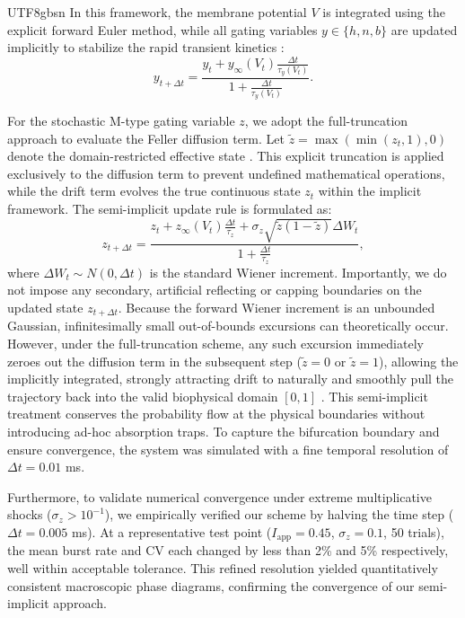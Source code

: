 ﻿\documentclass[reprint, amsmath, amssymb, aps, pre]{revtex4-2}
\begin{document}
\begin{CJK*}{UTF8}{gbsn}
In this framework, the membrane potential $V$ is integrated using the explicit forward Euler method, while all gating variables $y \in \{h, n, b\}$ are updated implicitly to stabilize the rapid transient kinetics \cite{rush1978practical, ermentrout2010mathematical}:
\begin{equation}
y_{t+\Delta t} = \frac{y_t + y_\infty(V_t) \frac{\Delta t}{\tau_y(V_t)}}{1 + \frac{\Delta t}{\tau_y(V_t)}}.
\end{equation}

For the stochastic M-type gating variable $z$, we adopt the full-truncation approach \cite{lord2010comparison, hutzenthaler2020perturbation} to evaluate the Feller diffusion term. Let $\tilde{z} = \max(\min(z_t, 1), 0)$ denote the domain-restricted effective state \cite{lord2010comparison}. This explicit truncation is applied exclusively to the diffusion term to prevent undefined mathematical operations, while the drift term evolves the true continuous state $z_t$ within the implicit framework. The semi-implicit update rule is formulated as:
\begin{equation}
z_{t+\Delta t} = \frac{z_t + z_\infty(V_t) \frac{\Delta t}{\tau_z} + \sigma_z \sqrt{\tilde{z}(1 - \tilde{z})} \Delta W_t}{1 + \frac{\Delta t}{\tau_z}},
\end{equation}
where $\Delta W_t \sim N(0, \Delta t)$ is the standard Wiener increment. Importantly, we do not impose any secondary, artificial reflecting or capping boundaries on the updated state $z_{t+\Delta t}$. Because the forward Wiener increment is an unbounded Gaussian, infinitesimally small out-of-bounds excursions can theoretically occur. However, under the full-truncation scheme, any such excursion immediately zeroes out the diffusion term in the subsequent step ($\tilde{z}=0$ or $\tilde{z}=1$), allowing the implicitly integrated, strongly attracting drift to naturally and smoothly pull the trajectory back into the valid biophysical domain $[0,1]$ \cite{lord2010comparison}. This semi-implicit treatment conserves the probability flow at the physical boundaries without introducing ad-hoc absorption traps. To capture the bifurcation boundary and ensure convergence, the system was simulated with a fine temporal resolution of $\Delta t = 0.01$ ms.

Furthermore, to validate numerical convergence under extreme multiplicative shocks ($\sigma_z > 10^{-1}$), we empirically verified our scheme by halving the time step ($\Delta t = 0.005$ ms). At a representative test point ($I_{\mathrm{app}} = 0.45$, $\sigma_z = 0.1$, 50 trials), the mean burst rate and CV each changed by less than 2\% and 5\% respectively, well within acceptable tolerance. This refined resolution yielded quantitatively consistent macroscopic phase diagrams, confirming the convergence of our semi-implicit approach.


\end{CJK*}
\end{document}
